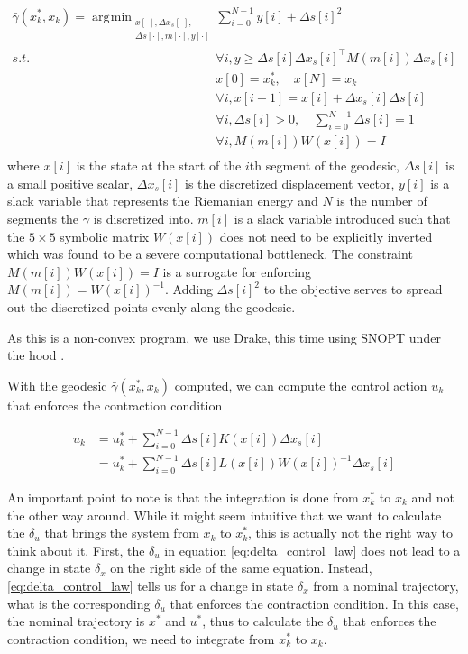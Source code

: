 \documentclass[journal]{IEEEtran}
\DeclareMathOperator*{\argmin}{\arg\!\min}
\begin{document}
\begin{equation}
	\label{eq:geodesic_opt}
	\begin{aligned}
		\bar{\gamma}(x^*_k, x_k) =
		\argmin_{ \substack{ x[\cdot], \Delta x_{s}[\cdot],\\ \Delta s[\cdot], m[\cdot], y[\cdot]}}
		 & \sum_{i=0}^{N-1} y[i] + \Delta s[i]^2 \\
		s.t. \quad & \forall i, y \geq \Delta s[i] \Delta x_s[i]^\top M(m[i]) \Delta x_s[i]\\
		& x[0] = x^*_k, \quad x[N] = x_k \\
		& \forall i, x[i+1] = x[i] + \Delta x_{s}[i]\Delta s[i] \\
		& \forall i, \Delta s[i] > 0, \quad \sum_{i=0}^{N-1} \Delta s[i] = 1\\
		& \forall i, M(m[i]) W(x[i]) = I  \\
	\end{aligned}
\end{equation}
where $x[i]$ is the state at the start of the $i$th segment of the geodesic, $\Delta s[i]$ is a small positive scalar, $\Delta x_s[i]$ is the discretized displacement vector, $y[i]$ is a slack variable that represents the Riemanian energy and $N$ is the number of segments the $\gamma$ is discretized into. $m[i]$ is a slack variable introduced such that the $5\times5$ symbolic matrix $W(x[i])$ does not need to be explicitly inverted which was found to be a severe computational bottleneck. The constraint $M(m[i]) W(x[i]) = I$ is a surrogate for enforcing $M(m[i])=W(x[i])^{-1}$. Adding $\Delta s[i]^2$ to the objective serves to spread out the discretized points evenly along the geodesic.

As this is a non-convex program, we use Drake, this time using SNOPT under the hood \autocite{DrakeModelBasedDesign}.

With the geodesic $\bar{\gamma}(x^*_k, x_k)$ computed, we can compute the control action $u_k$ that enforces the contraction condition

\begin{equation}
	\label{eq:control_law}
	\begin{aligned}
		u_k &= u^*_k + \sum_{i=0}^{N-1} \Delta s[i] K(x[i]) \Delta x_s[i]  \\
		&= u^*_k + \sum_{i=0}^{N-1} \Delta s[i] L(x[i]) W(x[i])^{-1} \Delta x_s[i]
	\end{aligned}
\end{equation}

An important point to note is that the integration is done from $x^*_k$ to $x_k$ and not the other way around. While it might seem intuitive that we want to calculate the $\delta_u$ that brings the system from $x_k$ to $x^*_k$, this is actually not the right way to think about it. First, the $\delta_u$ in equation \ref{eq:delta_control_law} does not lead to a change in state $\delta_x$ on the right side of the same equation. Instead, \ref{eq:delta_control_law} tells us for a change in state $\delta_x$ from a nominal trajectory, what is the corresponding $\delta_u$ that enforces the contraction condition. In this case, the nominal trajectory is $x^*$ and $u^*$, thus to calculate the $\delta_u$ that enforces the contraction condition, we need to integrate from $x^*_k$ to $x_k$.
\end{document}
